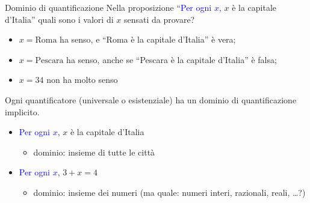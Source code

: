 \documentclass[aspectratio=169,10pt]{beamer}
\newcommand{\quant}[1]{\textcolor{blue}{#1}}
\begin{document}
\begin{frame}{Dominio di quantificazione}
    Nella proposizione ``\quant{Per ogni $x$,} $x$ è la capitale d'Italia'' quali sono i valori di $x$ sensati da provare?
    \begin{itemize}
        \item $x=\text{Roma}$ ha senso, e ``Roma è la capitale d'Italia'' è vera;
        \item $x=\text{Pescara}$ ha senso, anche se ``Pescara è la capitale d'Italia'' è falsa;
        \item $x=34$ non ha molto senso
    \end{itemize}
    Ogni quantificatore (universale o esistenziale) ha un \alert{dominio di quantificazione} implicito.
    \begin{itemize}
        \item \quant{Per ogni $x$}, $x$ è la capitale d’Italia \pause
        \begin{itemize}
            \item dominio: insieme di tutte le città
        \end{itemize}
        \pause
        \item \quant{Per ogni $x$}, $3 + x = 4$ \pause
        \begin{itemize}
            \item dominio: insieme dei numeri (ma quale: numeri interi, razionali, reali, \ldots ?)
        \end{itemize}
    \end{itemize}
\end{frame}
\end{document}
